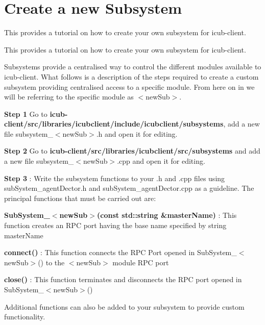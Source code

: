 \hypertarget{group__icubclient__create__subsystem}{}\section{Create a new Subsystem}
\label{group__icubclient__create__subsystem}


This provides a tutorial on how to create your own subsystem for icub-\/client.  


This provides a tutorial on how to create your own subsystem for icub-\/client. 

Subsystems provide a centralised way to control the different modules available to icub-\/client. What follows is a description of the steps required to create a custom subsystem providing centralised access to a specific module. From here on in we will be referring to the specific module as {\ttfamily $<$new\+Sub$>$}.

{\bfseries Step 1} Go to {\bfseries icub-\/client/src/libraries/icubclient/include/icubclient/subsystems}, add a new file {\ttfamily subsystem\+\_\+$<$new\+Sub$>$.h} and open it for editing.

{\bfseries Step 2} Go to {\bfseries icub-\/client/src/libraries/icubclient/src/subsystems} and add a new file {\ttfamily subsystem\+\_\+$<$new\+Sub$>$.cpp} and open it for editing.

{\bfseries Step 3} \+: Write the subsystem functions to your .h and .cpp files using {\ttfamily sub\+System\+\_\+agent\+Dector.\+h} and {\ttfamily sub\+System\+\_\+agent\+Dector.\+cpp} as a guideline. The principal functions that must be carried out are\+:
\begin{DoxyItemize}
\item {\bfseries Sub\+System\+\_\+$<$new\+Sub$>$(const std\+::string \&master\+Name)} \+: This function creates an R\+PC port having the base name specified by string {\ttfamily master\+Name}
\item {\bfseries connect()} \+: This function connects the R\+PC Port opened in {\ttfamily Sub\+System\+\_\+$<$new\+Sub$>$()} to the {\ttfamily $<$new\+Sub$>$} module R\+PC port
\item {\bfseries close()} \+: This function terminates and disconnects the R\+PC port opened in {\ttfamily Sub\+System\+\_\+$<$new\+Sub$>$()}
\end{DoxyItemize}

Additional functions can also be added to your subsystem to provide custom functionality.

